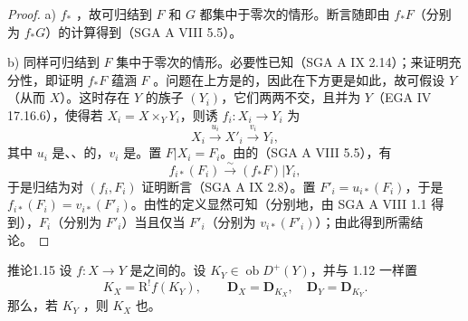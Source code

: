 \begin{proof}
a)  $f_*$ ，故可归结到 $F$ 和 $G$ 都集中于零次的情形。断言随即由 $f_*F$（分别为 $f_*G$）的计算得到（SGA A VIII 5.5）。

b) 同样可归结到 $F$ 集中于零次的情形。必要性已知（SGA A IX 2.14）；来证明充分性，即证明 $f_*F$ 蕴涵 $F$ 。问题在上方是的，因此在下方更是如此，故可假设 $Y$（从而 $X$）。这时存在 $Y$ 的族子 $(Y_i)$，它们两两不交，且并为 $Y$（EGA IV 17.16.6），使得若 $X_i=X\times_Y Y_i$，则诱 $f_i:X_i\longrightarrow Y_i$ 为
\[
 X_i\xrightarrow{u_i}X'_i\xrightarrow{v_i}Y_i,
\]
其中 $u_i$ 是、、的，$v_i$ 是。置 $F|X_i=F_i$。由的（SGA A VIII 5.5），有
\[
 f_{i*}(F_i)\xrightarrow{\sim}(f_*F)|Y_i,
\]
于是归结为对 $(f_i,F_i)$ 证明断言（SGA A IX 2.8）。置 $F'_i=u_{i*}(F_i)$，于是 $f_{i*}(F_i)=v_{i*}(F'_i)$。由性的定义显然可知（分别地，由 SGA A VIII 1.1 得到），$F_i$（分别为 $F'_i$）当且仅当 $F'_i$（分别为 $v_{i*}(F'_i)$）；由此得到所需结论。
\end{proof}
\begin{SGAresult}{推论}{1.15}
设 $f:X\longrightarrow Y$ 是之间的。设 $K_Y\in\operatorname{ob}D^+(Y)$，并与 1.12 一样置
\[
 K_X=\mathrm R^!f(K_Y),\qquad\mathbf D_X=\mathbf D_{K_X},\quad\mathbf D_Y=\mathbf D_{K_Y}.
\]
那么，若 $K_Y$ ，则 $K_X$ 也。
\end{SGAresult}

